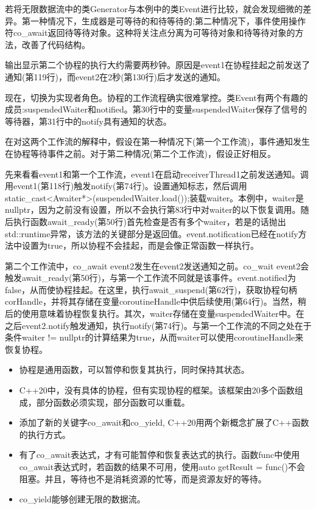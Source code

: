 若将无限数据流中的类Generator与本例中的类Event进行比较，就会发现细微的差异。第一种情况下，生成器是可等待的和待等待的;第二种情况下，事件使用操作符co\_await返回待等待对象。这种将关注点分离为可等待对象和待等待对象的方法，改善了代码结构。

输出显示第二个协程的执行大约需要两秒钟。原因是event1在协程挂起之前发送了通知(第119行)，而event2在2秒(第130行)后才发送的通知。

现在，切换为实现者角色。协程的工作流程确实很难掌控。类Event有两个有趣的成员:suspendedWaiter和notified。第30行中的变量suspendedWaiter保存了信号的等待器，第31行中的notify具有通知的状态。

在对这两个工作流的解释中，假设在第一种情况下(第一个工作流)，事件通知发生在协程等待事件之前。对于第二种情况(第二个工作流)，假设正好相反。

先来看看event1和第一个工作流，event1在启动receiverThread1之前发送通知。调用event1(第118行)触发notify(第74行)。设置通知标志，然后调用static\_cast<Awaiter*>(suspendedWaiter.load());装载waiter。本例中，waiter是nullptr，因为之前没有设置，所以不会执行第83行中对waiter的以下恢复调用。随后执行函数await\_ready(第50行)首先检查是否有多个waiter，若是的话抛出std::runtime异常，该方法的关键部分是返回值。event.notification已经在notify方法中设置为true，所以协程不会挂起，而是会像正常函数一样执行。

第二个工作流中，co\_await event2发生在event2发送通知之前。co\_wait event2会触发await\_ready(第50行)，与第一个工作流不同就是该事件。event.notified为false，从而使协程挂起。在这里，执行await\_suspend(第62行)，获取协程句柄corHandle，并将其存储在变量coroutineHandle中供后续使用(第64行)。当然，稍后的使用意味着协程恢复执行。其次，waiter存储在变量suspendedWaiter中。在之后event2.notify触发通知，执行notify(第74行)。与第一个工作流的不同之处在于条件waiter != nullptr的计算结果为true，从而waiter可以使用coroutineHandle来恢复协程。

\begin{tcolorbox}[breakable,enhanced jigsaw,colback=mygreen!5!white,colframe=mygreen!75!black,title={总结}]
	
\begin{itemize}
\item 
协程是通用函数，可以暂停和恢复其执行，同时保持其状态。

\item 
C++20中，没有具体的协程，但有实现协程的框架。该框架由20多个函数组成，部分函数必须实现，部分函数可以重载。

\item 
添加了新的关键字co\_await和co\_yield, C++20用两个新概念扩展了C++函数的执行方式。

\item 
有了co\_await表达式，才有可能暂停和恢复表达式的执行。函数func中使用co\_await表达式时，若函数的结果不可用，使用auto getResult = func()不会阻塞。并且，等待也不是消耗资源的忙等，而是资源友好的等待。

\item 
co\_yield能够创建无限的数据流。

\end{itemize}

\end{tcolorbox}

